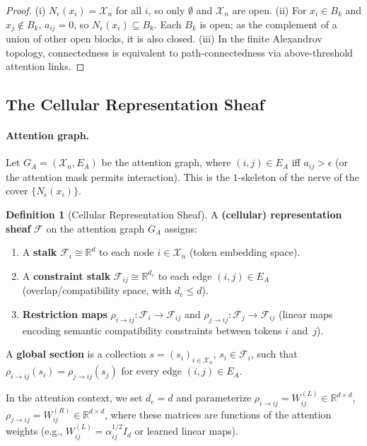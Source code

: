 \documentclass[11pt,a4paper]{article}
\theoremstyle{plain}
\theoremstyle{definition}
\newtheorem{definition}[theorem]{Definition}
\theoremstyle{remark}
\newcommand{\R}{\mathbb{R}}
\newcommand{\cF}{\mathcal{F}}
\newcommand{\cX}{\mathcal{X}}
\begin{document}
\begin{proof}
(i) $N_\epsilon(x_i) = \cX_n$ for all $i$, so only $\emptyset$ and $\cX_n$ are open. (ii) For $x_i \in B_k$ and $x_j \notin B_k$, $a_{ij} = 0$, so $N_\epsilon(x_i) \subseteq B_k$. Each $B_k$ is open; as the complement of a union of other open blocks, it is also closed. (iii) In the finite Alexandrov topology, connectedness is equivalent to path-connectedness via above-threshold attention links.
\end{proof}

\subsection{The Cellular Representation Sheaf}

\paragraph{Attention graph.}
Let $G_A = (\cX_n, E_A)$ be the attention graph, where $(i,j) \in E_A$ iff $a_{ij} > \epsilon$ (or the attention mask permits interaction). This is the $1$-skeleton of the nerve of the cover $\{N_\epsilon(x_i)\}$.

\begin{definition}[Cellular Representation Sheaf]\label{def:rep-sheaf}
A \textbf{(cellular) representation sheaf} $\cF$ on the attention graph $G_A$ assigns:
\begin{enumerate}[label=(\roman*),nosep]
\item A \textbf{stalk} $\cF_i \cong \R^d$ to each node $i \in \cX_n$ (token embedding space).
\item A \textbf{constraint stalk} $\cF_{ij} \cong \R^{d_e}$ to each edge $(i,j) \in E_A$ (overlap/compatibility space, with $d_e \leq d$).
\item \textbf{Restriction maps} $\rho_{i \to ij}: \cF_i \to \cF_{ij}$ and $\rho_{j \to ij}: \cF_j \to \cF_{ij}$ (linear maps encoding semantic compatibility constraints between tokens $i$ and~$j$).
\end{enumerate}
A \textbf{global section} is a collection $s = (s_i)_{i \in \cX_n}$, $s_i \in \cF_i$, such that $\rho_{i \to ij}(s_i) = \rho_{j \to ij}(s_j)$ for every edge $(i,j) \in E_A$.

In the attention context, we set $d_e = d$ and parameterize $\rho_{i \to ij} = W_{ij}^{(L)} \in \R^{d \times d}$, $\rho_{j \to ij} = W_{ij}^{(R)} \in \R^{d \times d}$, where these matrices are functions of the attention weights (e.g., $W_{ij}^{(L)} = \alpha_{ij}^{1/2} I_d$ or learned linear maps).
\end{definition}
\end{document}

